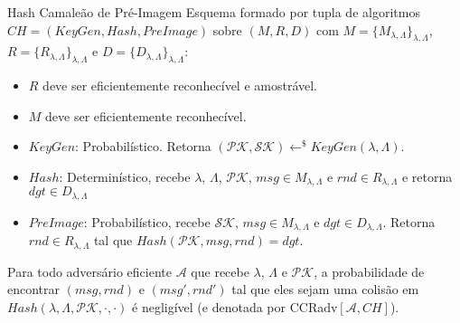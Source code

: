 \documentclass{beamer}
\begin{document}
\begin{frame}
\begin{block}{Hash Camaleão de Pré-Imagem}
    Esquema formado por tupla de algoritmos $CH=(KeyGen, Hash, PreImage)$ sobre $(M, R, D)$ com $M=\{M_{\lambda,\Lambda}\}_{\lambda, \Lambda}$, $R=\{R_{\lambda,\Lambda}\}_{\lambda, \Lambda}$ e $D=\{D_{\lambda,\Lambda}\}_{\lambda, \Lambda}$:
    \begin{itemize}
    \item $R$ deve ser eficientemente reconhecível e amostrável.
    \item $M$ deve ser eficientemente reconhecível.
        \item $KeyGen$: Probabilístico. Retorna $(\mathcal{PK}, \mathcal{SK})\leftarrow^{\$}KeyGen(\lambda,\Lambda)$.
        \item $Hash$: Determinístico, recebe $\lambda$, $\Lambda$, $\mathcal{PK}$, $msg\in M_{\lambda,\Lambda}$ e $rnd\in R_{\lambda,\Lambda}$ e retorna $dgt \in D_{\lambda,\Lambda}$
        \item $PreImage$: Probabilístico, recebe $\mathcal{SK}$, $msg \in M_{\lambda,\Lambda}$ e $dgt \in D_{\lambda,\Lambda}$. Retorna $rnd \in R_{\lambda,\Lambda}$ tal que $Hash(\mathcal{PK}, msg, rnd)=dgt$.
    \end{itemize}
    Para todo adversário eficiente $\mathcal{A}$ que recebe $\lambda$, $\Lambda$ e $\mathcal{PK}$, a probabilidade de encontrar $(msg, rnd)$ e $(msg', rnd')$ tal que eles sejam uma colisão em $Hash(\lambda, \Lambda, \mathcal{PK}, \cdot, \cdot)$ é negligível (e denotada por CCRadv$[\mathcal{A}, CH]$).
    \end{block}
\end{frame}
\end{document}
